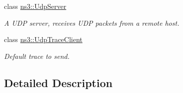 \begin{DoxyCompactItemize}
class \hyperlink{classns3_1_1UdpServer}{ns3\+::\+Udp\+Server}
\begin{DoxyCompactList}\small\item\em A U\+DP server, receives U\+DP packets from a remote host. \end{DoxyCompactList}\item 
class \hyperlink{structns3_1_1UdpTraceClient}{ns3\+::\+Udp\+Trace\+Client}
\begin{DoxyCompactList}\small\item\em Default trace to send. \end{DoxyCompactList}\end{DoxyCompactItemize}


\subsection{Detailed Description}
